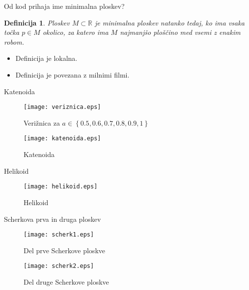 \documentclass{beamer}
\newtheorem{definicija}{Definicija}
\newcommand{\R}{\mathbb R}
\begin{document}
\begin{frame}{Od kod prihaja ime minimalna ploskev?}
    \begin{definicija}
        Ploskev $M \subset \R$ je \emph{minimalna ploskev} natanko tedaj, ko ima vsaka točka $p \in M$ 
        okolico, za katero ima $M$ najmanjšo ploščino med vsemi z enakim robom.
    \end{definicija}

    \begin{itemize}
        \item Definicija je lokalna.
        \item Definicija je povezana z milnimi filmi.
    \end{itemize}
\end{frame}

\begin{frame}{Katenoida}
    \begin{multicols}{2}

    \begin{figure}[h]
        \texttt{[image: veriznica.eps]}
        \caption{Verižnica za $a \in \left\{ 0.5, 0.6, 0.7, 0.8, 0.9, 1\right\}$ }
    \end{figure}

    \columnbreak

    \begin{figure}[h]
        \texttt{[image: katenoida.eps]}
        \caption{Katenoida}
    \end{figure}

\end{multicols}
\end{frame}


\begin{frame}{Helikoid}
    \begin{figure}[h]
        \texttt{[image: helikoid.eps]}
        \caption{Helikoid}
    \end{figure}
\end{frame}

\begin{frame}{Scherkova prva in druga ploskev}
    \begin{multicols}{2}

        \begin{figure}[h]
            \texttt{[image: scherk1.eps]}
            \caption{Del prve Scherkove ploskve}
        \end{figure}
        
        \columnbreak

        \begin{figure}[h]
            \texttt{[image: scherk2.eps]}
            \caption{Del druge Scherkove ploskve}
        \end{figure}

    \end{multicols}
\end{frame}
\end{document}
